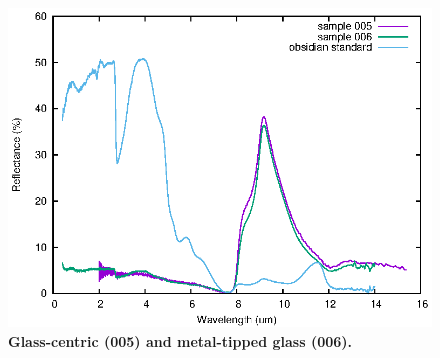 \documentclass[10pt,twoside,openany]{article}
\theoremstyle{definition}
\begin{document}
\begin{figure}
  \includegraphics[angle=0,height=0.9\textheight]{005-006.eps}
  \caption{\label{fig:005-006}\textbf{Glass-centric (005) and metal-tipped glass (006).}}
\end{figure}
\end{document}
